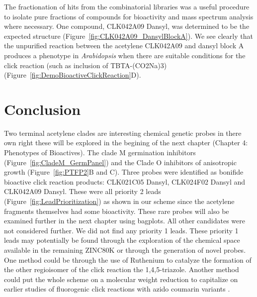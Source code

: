 The fractionation of hits from the combinatorial libraries was a useful procedure to isolate pure fractions of compounds for bioactivity and mass spectrum analysis where necessary. One compound, CLK042A09 Dansyl, was determined to be the expected structure (Figure~\ref{fig:CLK042A09_DansylBlockA}). We see clearly that the unpurified reaction between the acetylene CLK042A09 and dansyl block A produces a phenotype in {\it Arabidopsis} when there are suitable conditions for the click reaction (such as inclusion of TBTA-(CO2Na)3) (Figure~\ref{fig:DemoBioactiveClickReaction}D).

\section{Conclusion}

Two terminal acetylene clades are interesting chemical genetic probes in there own right these will be explored in the begining of the next chapter (Chapter 4: Phenotypes of Bioactives). The clade M germination inhibitors (Figure~\ref{fig:CladeM_GermPanel}) and the Clade O inhibitors of anisotropic growth (Figure~\ref{fig:PTFP2}B and C). Three probes were identified as bonifide bioactive click reaction products: CLK021C05 Dansyl, CLK024F02 Dansyl and CLK042A09 Dansyl. These were all priority 2 leads (Figure~\ref{fig:LeadPrioritization}) as shown in our scheme since the acetylene fragments themselves had some bioactivity. These rare probes will also be examined further in the next chapter using bagplots. All other candidates were not considered further. We did not find any priority 1 leads. These priority 1 leads may potentially be found through the exploration of the chemical space available in the remaining ZINC80K or through the generation of novel probes. One method could be through the use of Ruthenium to catalyze the formation of the other regioisomer of the click reaction the 1,4,5-triazole. Another method could put the whole scheme on a molecular weight reduction to capitalize on earlier studies of fluorogenic click reactions with azido coumarin variants \cite{sivakumar2004fluorogenic}. %


